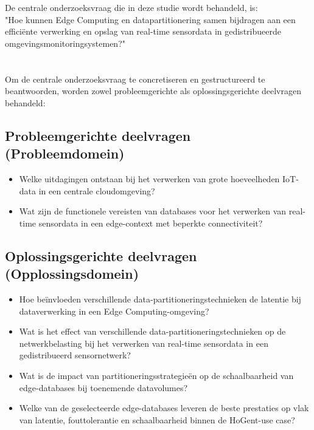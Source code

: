 \section{}%
\label{sec:onderzoeksvraag}

De centrale onderzoeksvraag die in deze studie wordt behandeld, is: 
\\ "Hoe kunnen Edge Computing en datapartitionering samen bijdragen aan een efficiënte verwerking en opslag van real-time sensordata in gedistribueerde omgevingsmonitoringsystemen?" \\ 

\section{}%
\label{sec:deelvragen}

Om de centrale onderzoeksvraag te concretiseren en gestructureerd te beantwoorden, worden zowel probleemgerichte als oplossingsgerichte deelvragen behandeld:

\subsection*{Probleemgerichte deelvragen (Probleemdomein)}
\begin{itemize}
    \item Welke uitdagingen ontstaan bij het verwerken van grote hoeveelheden IoT-data in een centrale cloudomgeving?
    \item Wat zijn de functionele vereisten van databases voor het verwerken van real-time sensordata in een edge-context met beperkte connectiviteit?
\end{itemize}

\subsection*{Oplossingsgerichte deelvragen (Opplossingsdomein)}
\begin{itemize}
    \item Hoe beïnvloeden verschillende data-partitioneringstechnieken de latentie bij dataverwerking in een Edge Computing-omgeving?
    \item Wat is het effect van verschillende data-partitioneringstechnieken op de netwerkbelasting bij het verwerken van real-time sensordata in een gedistribueerd sensornetwerk?
    \item Wat is de impact van partitioneringsstrategieën op de schaalbaarheid van edge-databases bij toenemende datavolumes?
    \item Welke van de geselecteerde edge-databases leveren de beste prestaties op vlak van latentie, fouttolerantie en schaalbaarheid binnen de HoGent-use case?
\end{itemize}

